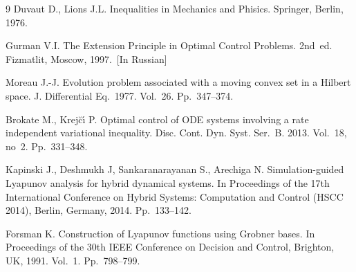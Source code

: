 \documentclass{article}
\begin{document}
\begin{thebibliography}{9} %
 Duvaut D., Lions J.L. Inequalities in Mechanics and Phisics. Springer, Berlin, 1976.

  Gurman V.I. The Extension Principle in Optimal Control Problems. 2nd~ed. Fizmatlit, Moscow, 1997.~[In Russian]

 Moreau J.-J. Evolution problem associated with a moving convex set in a Hilbert space. J. Differential Eq.~1977. Vol.~26. Pp.~347--374.

  Brokate M., Krej\u{c}\'{\i} P. Optimal control of ODE systems involving a rate independent variational inequality. Disc. Cont. Dyn. Syst. Ser.~B. 2013. Vol.~18, no~2. Pp.~331--348.

 Kapinski J., Deshmukh J, Sankaranarayanan S., Arechiga N. Simulation-guided Lyapunov analysis for hybrid dynamical systems. In Proceedings of the 17th International Conference on Hybrid Systems: Computation and Control (HSCC 2014), Berlin, Germany, 2014. Pp.~133--142.

 Forsman K. Construction of Lyapunov functions using Grobner bases. In Proceedings of the 30th IEEE Conference on Decision and Control, Brighton, UK, 1991. Vol.~1. Pp.~798--799.

\end{thebibliography}
\end{document}
